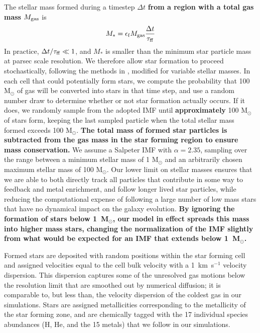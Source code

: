 \documentclass[fleqn,usenatbib,useAMS]{mnras}
\begin{document}
The stellar mass formed during a timestep $\Delta t$ \textbf{from a region with a total gas mass $M_{\rm gas}$} is
\begin{equation}
         M_* = \epsilon_{\rm f} M_{\rm gas} \frac{\Delta t}{\tau_{\rm ff}}
\end{equation}
In practice, $\Delta t/\tau_{\rm ff} \ll 1$, and $M_*$ is smaller than the minimum star particle mass at parsec scale resolution. We therefore allow star formation to proceed stochastically, following the methods in \citet{Goldbaum2015, Goldbaum2016}, modified for variable stellar masses. In each cell that could potentially form stars, we compute the probability that 100 M$_{\odot}$ of gas will be converted into stars in that time step, and use a random number draw to determine whether or not star formation actually occurs. If it does, we randomly sample from
the adopted IMF until \textbf{approximately} 100 M$_{\odot}$ of stars form, keeping the last sampled particle when the total stellar mass formed exceeds 100 M$_{\odot}$. \textbf{The total mass of formed star particles is subtracted from the gas mass in the star forming region to ensure mass conservation.} We assume a Salpeter IMF \citep{Salpeter1955} with $\alpha = 2.35$, sampling over the range between a minimum stellar mass of 1 M$_{\odot}$ and an arbitrarily chosen maximum stellar mass of 100 M$_{\odot}$. Our lower limit on stellar masses ensures that we are able to both directly track all particles that contribute in some way to feedback and metal enrichment, and follow longer lived star particles, while reducing the computational expense of following a large number of low mass stars that have no dynamical impact on the galaxy evolution. \textbf{By ignoring the formation of stars below 1~M$_{\odot}$, our model in effect spreads this mass into higher mass stars, changing the normalization of the IMF slightly from what would be expected for an IMF that extends below  1~M$_{\odot}$.}

Formed stars are deposited with random positions within the star forming cell and assigned velocities equal to the cell bulk velocity with a 1~km~s$^{-1}$ velocity dispersion. This dispersion captures some of the unresolved gas motions below the resolution limit that are smoothed out by numerical diffusion; it is comparable to, but less than, the velocity dispersion of the coldest gas in our simulations. Stars are assigned metallicities corresponding to the metallicity of the star forming zone, and are chemically tagged with the 17 individual species abundances (H, He, and the 15 metals) that we follow in our simulations. 
\end{document}
